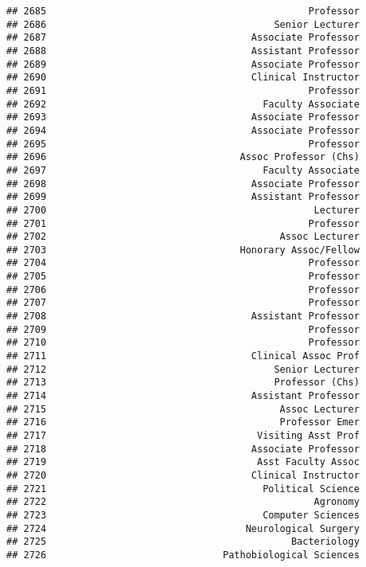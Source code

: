 \documentclass[
]{article}
\begin{document}
\begin{verbatim}
## 2685                                              Professor
## 2686                                        Senior Lecturer
## 2687                                    Associate Professor
## 2688                                    Assistant Professor
## 2689                                    Associate Professor
## 2690                                    Clinical Instructor
## 2691                                              Professor
## 2692                                      Faculty Associate
## 2693                                    Associate Professor
## 2694                                    Associate Professor
## 2695                                              Professor
## 2696                                  Assoc Professor (Chs)
## 2697                                      Faculty Associate
## 2698                                    Associate Professor
## 2699                                    Assistant Professor
## 2700                                               Lecturer
## 2701                                              Professor
## 2702                                         Assoc Lecturer
## 2703                                  Honorary Assoc/Fellow
## 2704                                              Professor
## 2705                                              Professor
## 2706                                              Professor
## 2707                                              Professor
## 2708                                    Assistant Professor
## 2709                                              Professor
## 2710                                              Professor
## 2711                                    Clinical Assoc Prof
## 2712                                        Senior Lecturer
## 2713                                        Professor (Chs)
## 2714                                    Assistant Professor
## 2715                                         Assoc Lecturer
## 2716                                         Professor Emer
## 2717                                     Visiting Asst Prof
## 2718                                    Associate Professor
## 2719                                     Asst Faculty Assoc
## 2720                                    Clinical Instructor
## 2721                                      Political Science
## 2722                                               Agronomy
## 2723                                      Computer Sciences
## 2724                                   Neurological Surgery
## 2725                                           Bacteriology
## 2726                               Pathobiological Sciences

\end{verbatim}
\end{document}
